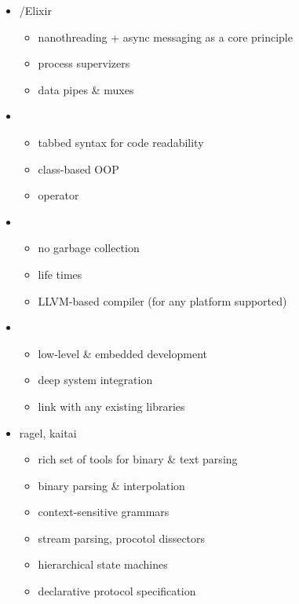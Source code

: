 \clearpage{}

\begin{itemize}
    \item \erl/Elixir
    \begin{itemize}
        \item nanothreading + async messaging as a core principle
        \item process supervizers
        \item data pipes \& muxes
    \end{itemize}
    \item \py
    \begin{itemize}
        \item tabbed syntax for code readability
        \item class-based OOP
        \item operator 
    \end{itemize}
    \item \rs
    \begin{itemize}
        \item no garbage collection
        \item life times
        \item LLVM-based compiler (for any platform supported)
    \end{itemize}
    \item \Cpp
    \begin{itemize}
        \item low-level \& embedded development
        \item deep system integration
        \item link with any existing libraries
    \end{itemize}
    \item ragel, kaitai
    \begin{itemize}
        \item rich set of tools for binary \& text parsing
        \item binary parsing \& interpolation
        \item context-sensitive grammars
        \item stream parsing, procotol dissectors
        \item hierarchical state machines
        \item declarative protocol specification
    \end{itemize}
\end{itemize}
